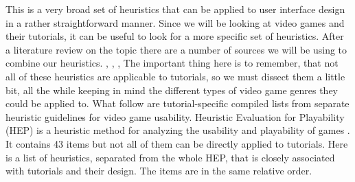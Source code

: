 This is a very broad set of heuristics that can be applied to user interface design in a rather straightforward manner. Since we will be looking at video games and their tutorials, it can be useful to look for a more specific set of heuristics. After a literature review on the topic there are a number of sources we will be using to combine our heuristics. \cite{Desurvire2004}, \cite{Desurvire2009}, \cite{Federoff2002}, \cite{Pinelle2008}
The important thing here is to remember, that not all of these heuristics are applicable to tutorials, so we must dissect them a little bit, all the while keeping in mind the different types of video game genres they could be applied to. What follow are tutorial-specific compiled lists from separate heuristic guidelines for video game usability. Heuristic Evaluation for Playability (HEP) is a heuristic method for analyzing the usability and playability of games \cite{Desurvire2004}. It contains 43 items but not all of them can be directly applied to tutorials. Here is a list of heuristics, separated from the whole HEP, that is closely associated with tutorials and their design. The items are in the same relative order.

